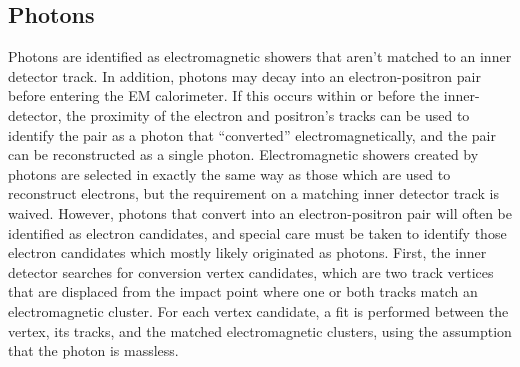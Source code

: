 \subsection{Photons}
Photons are identified as electromagnetic showers that aren't matched to an inner detector track.
In addition, photons may decay into an electron-positron pair before entering the EM calorimeter.
If this occurs within or before the inner-detector, the proximity of the electron and positron's tracks can be used to identify the pair as a photon that ``converted'' electromagnetically, and the pair can be reconstructed as a single photon.
Electromagnetic showers created by photons are selected in exactly the same way as those which are used to reconstruct electrons, but the requirement on a matching inner detector track is waived.  
However, photons that convert into an electron-positron pair will often be identified as electron candidates, and special care must be taken to identify those electron candidates which mostly likely originated as photons.
First, the inner detector searches for conversion vertex candidates, which are two track vertices that are displaced from the impact point where one or both tracks match an electromagnetic cluster.
For each vertex candidate, a fit is performed between the vertex, its tracks, and the matched electromagnetic clusters, using the assumption that the photon is massless.





